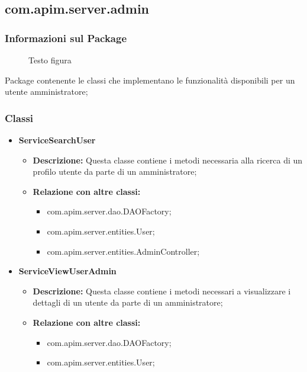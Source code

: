 {{     \subsection{com.apim.server.admin}{
    \subsubsection{Informazioni sul Package}
        \begin{figure}[ht]
          \centering
          \caption{Testo figura}
          \label{Testo figura}
        \end{figure}
        Package  contenente le classi che implementano le funzionalità disponibili per un utente amministratore;
        \subsubsection{Classi}
        \begin{itemize} \itemsep1pt
          \item \textbf{ServiceSearchUser}
          \begin{itemize}
            \item \textbf{Descrizione:} Questa classe contiene i metodi necessaria alla ricerca di un profilo utente da parte di un amministratore;
            \item \textbf{Relazione con altre classi:}
            \begin{itemize}
              \item com.apim.server.dao.DAOFactory;
              \item com.apim.server.entities.User;
              \item com.apim.server.entities.AdminController;
            \end{itemize}
          \end{itemize}
          \item \textbf{ServiceViewUserAdmin}
          \begin{itemize}
            \item \textbf{Descrizione:} Questa classe contiene i metodi necessari a visualizzare i dettagli di un utente da parte di un amministratore;
            \item \textbf{Relazione con altre classi:}
            \begin{itemize}
              \item com.apim.server.dao.DAOFactory;
              \item com.apim.server.entities.User;

\end{itemize}
\end{itemize}
\end{itemize}}}}
